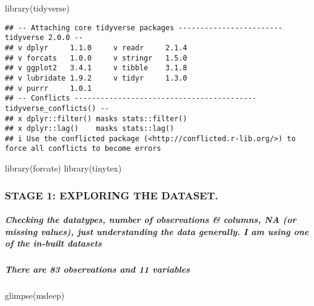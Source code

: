 \documentclass[
]{article}
\newenvironment{Shaded}{\begin{snugshade}}{\end{snugshade}}
\newcommand{\FunctionTok}[1]{\textcolor[rgb]{0.00,0.00,0.00}{#1}}
\newcommand{\NormalTok}[1]{#1}
\begin{document}
\begin{Shaded}
\begin{Highlighting}[]
\FunctionTok{library}\NormalTok{(tidyverse)}
\end{Highlighting}
\end{Shaded}

\begin{verbatim}
## -- Attaching core tidyverse packages ------------------------ tidyverse 2.0.0 --
## v dplyr     1.1.0     v readr     2.1.4
## v forcats   1.0.0     v stringr   1.5.0
## v ggplot2   3.4.1     v tibble    3.1.8
## v lubridate 1.9.2     v tidyr     1.3.0
## v purrr     1.0.1     
## -- Conflicts ------------------------------------------ tidyverse_conflicts() --
## x dplyr::filter() masks stats::filter()
## x dplyr::lag()    masks stats::lag()
## i Use the conflicted package (<http://conflicted.r-lib.org/>) to force all conflicts to become errors
\end{verbatim}

\begin{Shaded}
\begin{Highlighting}[]
\FunctionTok{library}\NormalTok{(forcats)}
\FunctionTok{library}\NormalTok{(tinytex)}
\end{Highlighting}
\end{Shaded}

\hypertarget{stage-1-exploring-the-dataset.}{%
\subsubsection{STAGE 1: EXPLORING THE
DATASET.}\label{stage-1-exploring-the-dataset.}}

\hypertarget{checking-the-datatypes-number-of-observations-columns-na-or-missing-values-just-understanding-the-data-generally.-i-am-using-one-of-the-in-built-datasets}{%
\subparagraph{Checking the datatypes, number of observations \& columns,
NA (or missing values), just understanding the data generally. I am
using one of the in-built
datasets}\label{checking-the-datatypes-number-of-observations-columns-na-or-missing-values-just-understanding-the-data-generally.-i-am-using-one-of-the-in-built-datasets}}

\hypertarget{there-are-83-observations-and-11-variables}{%
\subparagraph{There are 83 observations and 11
variables}\label{there-are-83-observations-and-11-variables}}

\begin{Shaded}
\begin{Highlighting}[]
\FunctionTok{glimpse}\NormalTok{(msleep)}
\end{Highlighting}
\end{Shaded}
\end{document}
